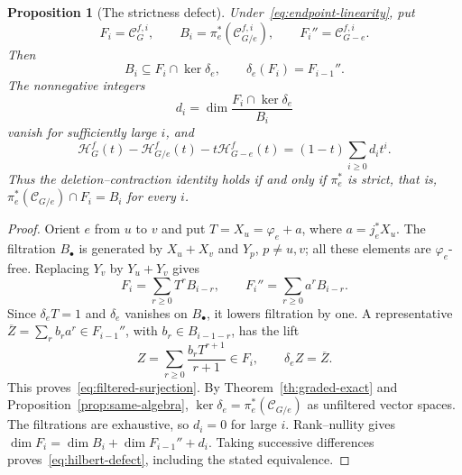 \documentclass[reqno]{article}
\theoremstyle{plain} %
\newtheorem{proposition}[theorem]{Proposition}
\theoremstyle{definition}
\theoremstyle{remark}
\newcommand {\CC}{\mathscr{C}}
\newcommand{\hs}{\mathscr{H}}
\numberwithin{equation}{section}
\begin{document}
\begin{proposition}[The strictness defect]\label{prop:filtered-defect}
Under~\eqref{eq:endpoint-linearity}, put
\[
F_i=\CC_G^{f,i},\qquad B_i=\pi_e^*(\CC_{G/e}^{f,i}),\qquad
F_i''=\CC_{G-e}^{f,i}.
\]
Then
\begin{equation}\label{eq:filtered-surjection}
B_i\subseteq F_i\cap\ker\delta_e,\qquad
\delta_e(F_i)=F_{i-1}''.
\end{equation}
The nonnegative integers
\begin{equation}\label{eq:strictness-defect}
d_i=\dim\frac{F_i\cap\ker\delta_e}{B_i}
\end{equation}
vanish for sufficiently large $i$, and
\begin{equation}\label{eq:hilbert-defect}
\hs_G^f(t)-\hs_{G/e}^f(t)-t\hs_{G-e}^f(t)
=(1-t)\sum_{i\ge0}d_it^i.
\end{equation}
Thus the deletion--contraction identity holds if and only if $\pi_e^*$
is strict, that is, $\pi_e^*(\CC_{G/e})\cap F_i=B_i$ for every $i$.
\end{proposition}
\begin{proof}
Orient $e$ from $u$ to $v$ and put
$T=X_u=\varphi_e+a$, where $a=j_e^*X_u$.
The filtration $B_\bullet$ is generated by $X_u+X_v$ and $Y_p$, $p\ne u,v$;
all these elements are $\varphi_e$-free. Replacing $Y_v$ by $Y_u+Y_v$
gives
\[
F_i=\sum_{r\ge0}T^rB_{i-r},\qquad
F_i''=\sum_{r\ge0}a^rB_{i-r}.
\]
Since $\delta_eT=1$ and $\delta_e$ vanishes on $B_\bullet$, it lowers
filtration by one. A representative
$\overline Z=\sum_rb_ra^r\in F_{i-1}''$, with $b_r\in B_{i-1-r}$,
has the lift
\[
Z=\sum_{r\ge0}\frac{b_rT^{r+1}}{r+1}\in F_i,
\qquad \delta_eZ=\overline Z.
\]
This proves~\eqref{eq:filtered-surjection}.
By Theorem~\ref{th:graded-exact} and Proposition~\ref{prop:same-algebra},
$\ker\delta_e=\pi_e^*(\CC_{G/e})$ as unfiltered vector spaces.
The filtrations are exhaustive, so $d_i=0$ for large $i$.
Rank--nullity gives
$\dim F_i=\dim B_i+\dim F_{i-1}''+d_i$.
Taking successive differences proves~\eqref{eq:hilbert-defect}, including
the stated equivalence.
\end{proof}
\end{document}
